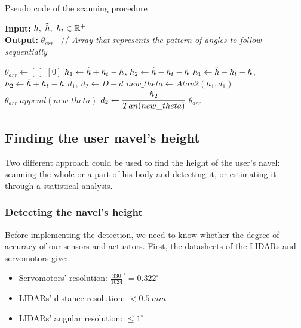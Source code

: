 \documentclass{article}
\begin{document}
\begin{algorithm}[H]
    \caption{Pseudo code of the scanning procedure}
    \label{alg:scan_algo}
    
    \hspace*{\algorithmicindent} \textbf{Input:} $h,\ \Tilde{h},\ h_t \in \mathbb{R}^+ $ \\
    \hspace*{\algorithmicindent} \textbf{Output:} $\theta_{arr}$ \ // \textit{Array that represents the pattern of angles to follow sequentially}
    \begin{algorithmic}[1]
        \STATE $\theta_{arr} \leftarrow [\ ]$
            \RETURN  $[0]$
        \ENDIF 
            \STATE $h_1 \leftarrow \Tilde{h}+h_t-h$, $h_2 \leftarrow  \Tilde{h}-h_t-h$
        \ELSE
            \STATE $h_1 \leftarrow \Tilde{h}-h_t-h$, $h_2 \leftarrow  \Tilde{h}+h_t-h$
        \ENDIF
        \STATE $d_1,\ d_2 \leftarrow D-d$
            \STATE $new\_theta \leftarrow Atan2(h_1,d_1)$
            \STATE $\theta_{arr}.append(new\_theta)$
            \STATE $d_2 \leftarrow \cfrac{h_2}{Tan(new\_theta)}$
        \ENDWHILE
        \RETURN $\theta_{arr}$
    \end{algorithmic}
\end{algorithm}


\subsection{Finding the user navel's height}

Two different approach could be used to find the height of the user's navel: scanning the whole or a part of his body and detecting it, or estimating it through a statistical analysis.

\subsubsection{Detecting the navel's height}

Before implementing the detection, we need to know whether the degree of accuracy of our sensors and actuators. First, the datasheets of the LIDARs and servomotors give:

\begin{itemize}
    \item Servomotors' resolution: $\frac{330}{1024}^\circ = 0.322^\circ$
    \item LIDARs' distance resolution: $<0.5\ mm$ 
    \item LIDARs' angular resolution: $\leq 1^\circ$ 
\end{itemize}
\end{document}
